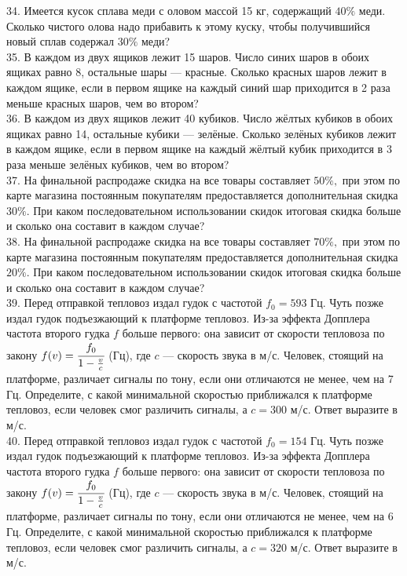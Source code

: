 \documentclass[12pt]{article}
\begin{document}
34. Имеется кусок сплава меди с оловом массой 15 кг, содержащий $40\%$ меди. Сколько чистого олова надо прибавить к этому куску, чтобы получившийся новый сплав содержал $30\%$ меди?\\
35. В каждом из двух ящиков лежит 15 шаров. Число синих шаров в обоих ящиках равно 8, остальные шары --- красные. Сколько красных шаров лежит в каждом ящике, если в первом ящике на каждый синий шар приходится в 2 раза меньше красных шаров, чем во втором?\\
36. В каждом из двух ящиков лежит 40 кубиков. Число жёлтых кубиков в обоих ящиках равно 14, остальные кубики --- зелёные. Сколько зелёных кубиков лежит в каждом ящике, если в первом ящике на каждый жёлтый кубик приходится в 3 раза меньше зелёных кубиков, чем во втором?\\
37. На финальной распродаже скидка на все товары составляет $50\%,$ при этом по карте магазина постоянным покупателям предоставляется дополнительная скидка $30\%.$ При каком последовательном использовании скидок итоговая скидка больше и сколько она составит в каждом случае?\\
38. На финальной распродаже скидка на все товары составляет $70\%,$ при этом по карте магазина постоянным покупателям предоставляется дополнительная скидка $20\%.$ При каком последовательном использовании скидок итоговая скидка больше и сколько она составит в каждом случае?\\
39. Перед отправкой тепловоз издал гудок с частотой $f_0=593$ Гц. Чуть позже издал гудок подъезжающий к платформе тепловоз. Из-за эффекта Допплера частота второго гудка $f$ больше первого: она зависит от скорости тепловоза по закону $f(v)=\cfrac{f_0}{1-\frac{v}{c}}$ (Гц), где $c$ --- скорость звука в м/с. Человек, стоящий на платформе, различает сигналы по тону, если они отличаются не менее, чем на 7 Гц. Определите, с какой минимальной скоростью приближался к платформе тепловоз, если человек смог различить сигналы, а $c=300$ м/с. Ответ выразите в м/с.\\
40. Перед отправкой тепловоз издал гудок с частотой $f_0=154$ Гц. Чуть позже издал гудок подъезжающий к платформе тепловоз. Из-за эффекта Допплера частота второго гудка $f$ больше первого: она зависит от скорости тепловоза по закону $f(v)=\cfrac{f_0}{1-\frac{v}{c}}$ (Гц), где $c$ --- скорость звука в м/с. Человек, стоящий на платформе, различает сигналы по тону, если они отличаются не менее, чем на 6 Гц. Определите, с какой минимальной скоростью приближался к платформе тепловоз, если человек смог различить сигналы, а $c=320$ м/с. Ответ выразите в м/с.\\
\end{document}
